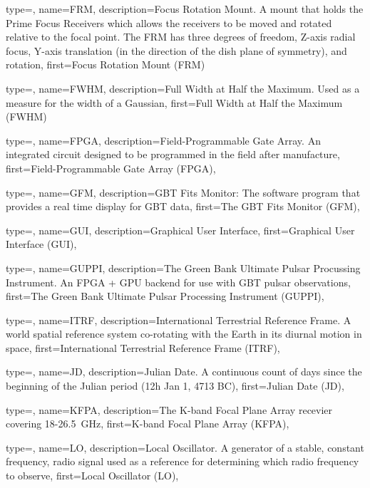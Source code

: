 {
  type=\acronymtype,
  name={FRM},
  description={Focus Rotation Mount.
A mount that holds the Prime Focus Receivers which allows the 
receivers to be moved and rotated relative to the focal point.  The FRM has 
three degrees of freedom, Z-axis radial focus, Y-axis translation (in the 
direction of the dish plane of symmetry), and rotation},
  first={Focus Rotation Mount (FRM)}
}

{
  type=\acronymtype,
  name={FWHM},
  description={Full Width at Half the Maximum.
Used as a measure for the width of a Gaussian},
  first={Full Width at Half the Maximum (FWHM)}
}

{
  type=\acronymtype,
  name={FPGA},
  description={Field-Programmable Gate Array.
An integrated circuit designed to be programmed in the field
after manufacture},
  first={Field-Programmable Gate Array (FPGA)},
} 

{
  type=\acronymtype,
  name={GFM},
  description={GBT Fits Monitor: The software program that provides a real
               time display for GBT data},
  first={The GBT Fits Monitor (GFM)},
} 

{
  type=\acronymtype,
  name={GUI},
  description={Graphical User Interface},
  first={Graphical User Interface (GUI)},
} 

{
  type=\acronymtype,
  name={GUPPI},
  description={The Green Bank Ultimate Pulsar Procussing Instrument.
      An FPGA + GPU backend for use with GBT pulsar observations},
  first={The Green Bank Ultimate Pulsar Processing Instrument (GUPPI)},
} 

{
  type=\acronymtype,
  name={ITRF},
  description={International Terrestrial Reference Frame.
A world spatial reference system co-rotating with the
Earth in its diurnal motion in space},
  first={International Terrestrial Reference Frame (ITRF)},
} 

{
  type=\acronymtype,
  name={JD},
  description={Julian Date. A continuous count of days since the beginning
               of the Julian period (12h Jan 1, 4713 BC)},
  first={Julian Date (JD)},
} 

{
  type=\acronymtype,
  name={KFPA},
  description={The K-band Focal Plane Array recevier covering 18-26.5~GHz},
  first={K-band Focal Plane Array (KFPA)},
} 

{
  type=\acronymtype,
  name={LO},
  description={Local Oscillator.
A generator of a stable, constant frequency, radio signal used 
as a reference for determining which radio frequency to observe},
  first={Local Oscillator (LO)},
}

